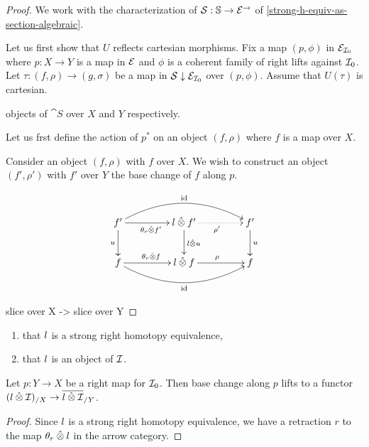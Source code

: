 \documentclass[reqno,10pt,a4paper,oneside]{amsart}
\begin{document}
\begin{proof}
We work with the characterization of $\cal{S} : \cat{S} \to \catE^{\to}$ of \cref{strong-h-equiv-as-section-algebraic}.

Let us first show that $U$ reflects cartesian morphisms.
Fix a map $(p, \phi)$ in $\catE_{\cal{I}_0}$ where $p : X \to Y$ is a map in $\catE$ and $\phi$ is a coherent family of right lifts against $\cal{I}_0$.
Let $\tau : (f, \rho) \to (g, \sigma)$ be a map in $\cal{S} \downarrow \catE_{\cal{I}_0}$ over $(p, \phi)$.
Assume that $U(\tau)$ is cartesian.

objects of $\cat{S}$ over $X$ and $Y$ respectively.


Let us frst define the action of $p^*$ on an object $(f, \rho)$ where $f$ is a map over $X$.


Consider an object $(f, \rho)$ with $f$ over $X$.
We wish to construct an object $(f', \rho')$ with $f'$ over $Y$ the base change of $f$ along $p$.

\[
\xymatrix@C+2em{
  f'
  \ar[r]_{\thetar \hatotimes f'}
  \ar[d]_{u}
  \ar@/^2em/[rr]^{\id}
&
  \intervall \hatotimes f'
  \ar@{.>}[r]_{\rho'}
  \ar[d]^{\intervall \hatotimes u}
&
  f'
  \ar[d]^{u}
\\
  f
  \ar[r]^{\thetar \hatotimes f}
  \ar@/_2em/[rr]_{\id}
&
  \intervall \hatotimes f
  \ar[r]^{\rho}
&
  f
}
\]

slice over X
->
slice over Y


\end{proof}

\begin{lemma}
\begin{enumerate}
Assume:
\item
that $\intervall$ is a strong right homotopy equivalence,
\item
that $\intervall$ is an object of $\cal{I}$.
\end{enumerate}
Let $p : Y \to X$ be a right map for $\cal{I}_0$.
Then base change along $p$ lifts to a functor $(\intervall \hatotimes \cal{I})_{/X} \to \overline{\intervall \hatotimes \cal{I}}_{/Y}$.
\end{lemma}

\begin{proof}
Since $\intervall$ is a strong right homotopy equivalence, we have a retraction $r$ to the map $\thetar \hatotimes \intervall$ in the arrow category.

\end{proof}
\end{document}
